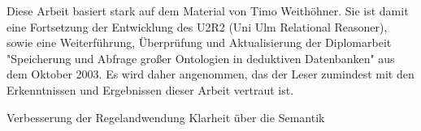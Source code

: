 

Diese Arbeit basiert stark auf dem Material von Timo Weithöhner. Sie ist damit eine Fortsetzung der Entwicklung des U2R2 (Uni Ulm Relational Reasoner), sowie eine Weiterführung, Überprüfung und Aktualisierung der Diplomarbeit "Speicherung und Abfrage großer Ontologien in deduktiven Datenbanken" aus dem Oktober 2003. Es wird daher angenommen, das der Leser zumindest mit den Erkenntnissen und Ergebnissen dieser Arbeit vertraut ist.

Verbesserung der Regelandwendung Klarheit über die Semantik
